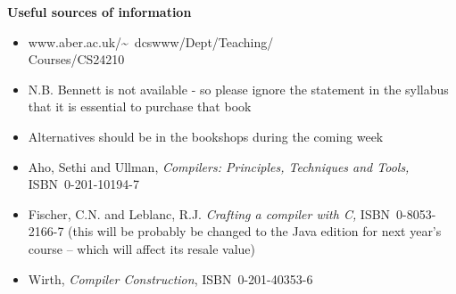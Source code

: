 %
%
\begin{slide}{}
{\small
{\bf Useful sources of information}
\begin{itemize}
\item www.aber.ac.uk/\~~dcswww/Dept/Teaching/\\Courses/CS24210
\item N.B. Bennett is not available - so please ignore the statement
in the syllabus that it is essential to purchase that book
\item Alternatives should be in the bookshops during the coming week
\item Aho, Sethi and Ullman, {\em Compilers: Principles, Techniques and Tools,} ISBN~0-201-10194-7
\item Fischer, C.N. and Leblanc, R.J. {\em Crafting a compiler with C,}
ISBN~0-8053-2166-7 (this will be probably be changed to the Java edition 
for next year's course -- which will affect its resale value)
\item Wirth, {\em Compiler Construction}, ISBN~0-201-40353-6 
\end{itemize}
}
\end{slide}


%
%
% 
%
% 

